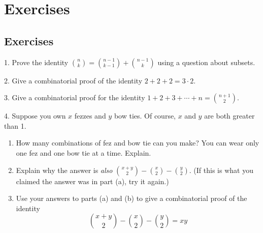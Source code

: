 \documentclass[10pt,]{book}
\theoremstyle{plain}
\theoremstyle{definition}
\numberwithin{equation}{chapter}
\begin{document}
\section[Exercises]{Exercises}\label{section-8}
\typeout{************************************************}
\typeout{************************************************}
\subsection[Exercises]{Exercises}\label{exercises_comb-proofs}
\begin{exerciselist}
\item[1.]\hypertarget{exercise-83}{}
          Prove the identity \({n\choose k} = {n-1 \choose k-1} + {n-1 \choose k}\) using a question about subsets.
\par\smallskip
\item[2.]\hypertarget{exercise-84}{}
          Give a combinatorial proof of the identity \(2+2+2 = 3\cdot 2\).
\par\smallskip
\item[3.]\hypertarget{exercise-85}{}
          Give a combinatorial proof for the identity \(1 + 2 + 3 + \cdots + n = {n+1 \choose 2}\).
\par\smallskip
\item[4.]\hypertarget{exercise-86}{}
          Suppose you own \(x\) fezzes and \(y\) bow ties. Of course, \(x\) and \(y\) are both greater than 1.
        \leavevmode%
\begin{enumerate}[label=(\alph*)]
\item\hypertarget{li-291}{}
              How many combinations of fez and bow tie can you make? You can wear only one fez and one bow tie at a time. Explain.


\item\hypertarget{li-292}{}
              Explain why the answer is \emph{also} \({x+y \choose 2} - {x \choose 2} - {y \choose 2}\). (If this is what you claimed the answer was in part (a), try it again.)


\item\hypertarget{li-293}{}
              Use your answers to parts (a) and (b) to give a combinatorial proof of the identity
              \begin{equation*}
                {x+y \choose 2} - {x \choose 2} - {y \choose 2} = xy
              \end{equation*}


\end{enumerate}
\end{exerciselist}
\end{document}

